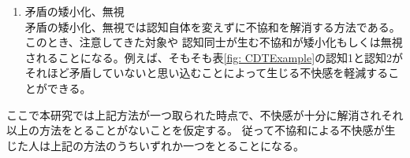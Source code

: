 \documentclass{kuisthesis}
\begin{document}
\begin{enumerate}
\begin{table}[H]
\end{table}

  \item 矛盾の矮小化、無視 \\
  矛盾の矮小化、無視では認知自体を変えずに不協和を解消する方法である。このとき、注意してきた対象や
  認知同士が生む不協和が矮小化もしくは無視されることになる。例えば、そもそも表\ref{fig: CDTExample}の認知1と認知2が
それほど矛盾していないと思い込むことによって生じる不快感を軽減することができる。

\end{enumerate}
\vspace{5mm}
ここで本研究では上記方法が一つ取られた時点で、不快感が十分に解消されそれ以上の方法をとることがないことを仮定する。
従って不協和による不快感が生じた人は上記の方法のうちいずれか一つをとることになる。
\end{document}
